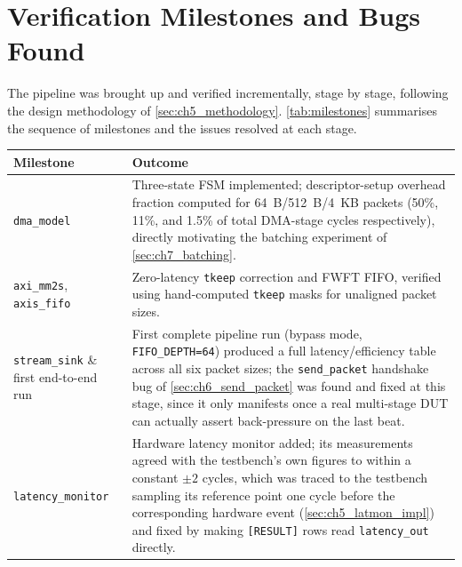 
\section{Verification Milestones and Bugs Found}
\label{sec:ch6_milestones}

The pipeline was brought up and verified incrementally, stage by stage, following the design methodology of \autoref{sec:ch5_methodology}. \autoref{tab:milestones} summarises the sequence of milestones and the issues resolved at each stage.

\begin{table}[htbp]
\centering
\begin{tabular}{@{}p{2.6cm}p{9.7cm}@{}}
\toprule
\textbf{Milestone} & \textbf{Outcome} \\
\midrule
\texttt{dma\_model} & Three-state FSM implemented; descriptor-setup overhead fraction computed for 64~B/512~B/4~KB packets (50\%, 11\%, and 1.5\% of total DMA-stage cycles respectively), directly motivating the batching experiment of \autoref{sec:ch7_batching}. \\
\texttt{axi\_mm2s}, \texttt{axis\_fifo} &
Zero-latency \texttt{tkeep} correction and FWFT FIFO, verified using hand-computed \texttt{tkeep} masks for unaligned packet sizes. \\
\texttt{stream\_sink} \& first end-to-end run & First complete pipeline run (bypass mode, \texttt{FIFO\_DEPTH=64}) produced a full latency/efficiency table across all six packet sizes; the \texttt{send\_packet} handshake bug of \autoref{sec:ch6_send_packet} was found and fixed at this stage, since it only manifests once a real multi-stage DUT can actually assert back-pressure on the last beat. \\
\texttt{latency\_monitor} & Hardware latency monitor added; its measurements agreed with the testbench's own figures to within a constant $\pm 2$ cycles, which was traced to the testbench sampling its reference point one cycle before the corresponding hardware event (\autoref{sec:ch5_latmon_impl}) and fixed by making \texttt{[RESULT]} rows read \texttt{latency\_out} directly. \\

\end{tabular}
\end{table}

